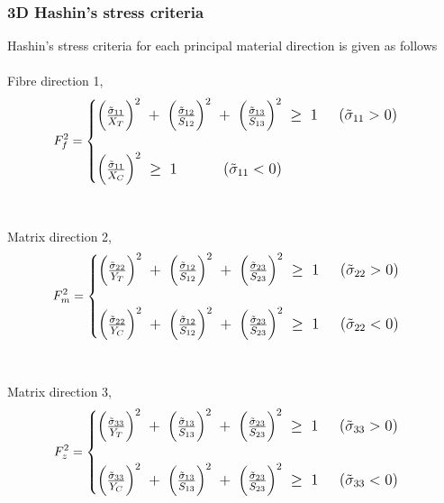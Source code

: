\documentclass[a4paper,14pt]{extarticle}
\begin{document}
\subsubsection{3D Hashin's stress criteria}
\indent\indent\indent Hashin's stress criteria for each principal material direction is given as follows
\\
\\
Fibre direction 1,
\\
\begin{equation}
\large{F_{f}^{2} =  
	\begin{cases}
	\Big(\frac{\tilde{\sigma}_{11}}{X_{T}}\Big)^{2} \; + \; \Big(\frac{\tilde{\sigma}_{12}}{S_{12}}\Big)^{2} \; + \; \Big(\frac{\tilde{\sigma}_{13}}{S_{13}}\Big)^{2} \; \geq  \; 1  \; \; \; \; \;  (\tilde{\sigma}_{11}  >  0)  \\
	\\
	\Big(\frac{\tilde{\sigma}_{11}}{X_{C}}\Big)^{2}  \; \geq  \; 1 \; \; \; \; \; \; \;  \; \; \; \;  (\tilde{\sigma}_{11}  <  0) 
	
	\end{cases}}
\end{equation}
\\
\\
Matrix direction 2,
\\
\begin{equation}
\large{F_{m}^{2} =  
	\begin{cases} 
		\Big(\frac{\tilde{\sigma}_{22}}{Y_{T}}\Big)^{2} \; + \; \Big(\frac{\tilde{\sigma}_{12}}{S_{12}}\Big)^{2} \; + \; \Big(\frac{\tilde{\sigma}_{23}}{S_{23}}\Big)^{2} \; \geq  \; 1  \; \; \; \; \;  (\tilde{\sigma}_{22}  >  0)  \\
		\\
		\Big(\frac{\tilde{\sigma}_{22}}{Y_{C}}\Big)^{2} \; + \; \Big(\frac{\tilde{\sigma}_{12}}{S_{12}}\Big)^{2} \; + \; \Big(\frac{\tilde{\sigma}_{23}}{S_{23}}\Big)^{2} \; \geq  \; 1  \; \; \; \; \;  (\tilde{\sigma}_{22}  <  0)  \\		
	\end{cases}}
\end{equation}
\\
\\
Matrix direction 3,
\\
\begin{equation}
\large{F_{z}^{2} =  
	\begin{cases} 
		\Big(\frac{\tilde{\sigma}_{33}}{Y_{T}}\Big)^{2} \; + \; \Big(\frac{\tilde{\sigma}_{13}}{S_{13}}\Big)^{2} \; + \; \Big(\frac{\tilde{\sigma}_{23}}{S_{23}}\Big)^{2} \; \geq  \; 1  \; \; \; \; \;  (\tilde{\sigma}_{33}  >  0)  \\
		\\
		\Big(\frac{\tilde{\sigma}_{33}}{Y_{C}}\Big)^{2} \; + \; \Big(\frac{\tilde{\sigma}_{13}}{S_{13}}\Big)^{2} \; + \; \Big(\frac{\tilde{\sigma}_{23}}{S_{23}}\Big)^{2} \; \geq  \; 1  \; \; \; \; \;  (\tilde{\sigma}_{33}  <  0)  \\		
	\end{cases}}
\end{equation}
\end{document}

